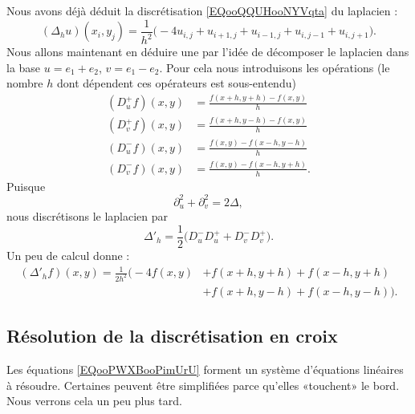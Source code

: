 Nous avons déjà déduit la discrétisation \eqref{EQooQQUHooNYVqta} du laplacien :
\begin{equation}
	(\Delta_hu)(x_i,y_j)=\frac{1}{ h^2 }\big( -4u_{i,j}+u_{i+1,j}+u_{i-1,j}+u_{i,j-1}+u_{i,j+1} \big).
\end{equation}
Nous allons maintenant en déduire une par l'idée de décomposer le laplacien dans la base \( u=e_1+e_2\), \( v=e_1-e_2\). Pour cela nous introduisons les opérations (le nombre \( h\) dont dépendent ces opérateurs est sous-entendu)
\begin{subequations}
	\begin{align}
		(D^+_uf)(x,y) & =\frac{ f(x+h,y+h)-f(x,y) }{ h }  \\
		(D^+_vf)(x,y) & =\frac{ f(x+h,y-h)-f(x,y) }{ h }  \\
		(D^-_uf)(x,y) & =\frac{ f(x,y)-f(x-h,y-h) }{ h }  \\
		(D^-_vf)(x,y) & =\frac{ f(x,y)-f(x-h,y+h) }{ h }.
	\end{align}
\end{subequations}
Puisque
\begin{equation}
	\partial_u^2+\partial_v^2=2\Delta,
\end{equation}
nous discrétisons le laplacien par
\begin{equation}
	\Delta'_h=\frac{ 1 }{2}\big( D_u^-D_u^++D_v^-D_v^+ \big).
\end{equation}
Un peu de calcul donne :
\begin{subequations}   \label{EQooLHBDooSBFkho}
	\begin{align}
		(\Delta'_hf)(x,y)=\frac{1}{ 2h^2 }\Big( -4f(x,y) & +f(x+h,y+h)+f(x-h,y+h)        \\
		                                                 & +f(x+h,y-h)+f(x-h,y-h) \Big).
	\end{align}
\end{subequations}

\subsection{Résolution de la discrétisation en croix}

Les équations \eqref{EQooPWXBooPimUrU} forment un système d'équations linéaires à résoudre. Certaines peuvent être simplifiées parce qu'elles «touchent» le bord. Nous verrons cela un peu plus tard.

